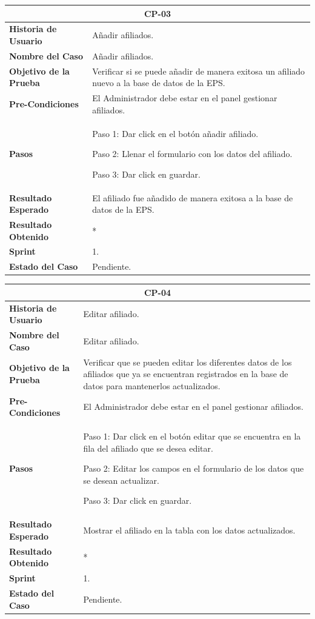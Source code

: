 \documentclass[12pt,a4paper]{article}
\begin{document}
\begin{center}
\begin{tabular}{|m{5cm}|m{9cm}|}
\hline
\multicolumn{2}{|c|}{\textbf{CP-03}} \\
\hline
\textbf{Historia de Usuario} & Añadir afiliados. \\
\hline
\textbf{Nombre del Caso} & Añadir afiliados. \\
\hline
\textbf{Objetivo de la Prueba} & Verificar si se puede añadir de manera exitosa un afiliado nuevo a la base de datos de la EPS. \\
\hline
\textbf{Pre-Condiciones} & El Administrador debe estar en el panel gestionar afiliados. \\
\hline
\textbf{Pasos} & Paso 1: Dar click en el botón añadir afiliado.

Paso 2: Llenar el formulario con los datos del afiliado.

Paso 3: Dar click en guardar.\\
\hline
\textbf{Resultado Esperado} & El afiliado fue añadido de manera exitosa a la base de datos de la EPS. \\
\hline
\textbf{Resultado Obtenido} & * \\
\hline
\textbf{Sprint} & 1. \\
\hline
\textbf{Estado del Caso} & Pendiente. \\
\hline
\end{tabular}
\vspace{5mm}

\begin{tabular}{|m{5cm}|m{9cm}|}
\hline
\multicolumn{2}{|c|}{\textbf{CP-04}} \\
\hline
\textbf{Historia de Usuario} & Editar afiliado. \\
\hline
\textbf{Nombre del Caso} & Editar afiliado. \\
\hline
\textbf{Objetivo de la Prueba} & Verificar que se pueden editar los diferentes datos de los afiliados que ya se encuentran registrados en la base de datos para mantenerlos actualizados. \\
\hline
\textbf{Pre-Condiciones} & El Administrador debe estar en el panel gestionar afiliados. \\
\hline
\textbf{Pasos} & Paso 1: Dar click en el botón editar que se encuentra en la fila del afiliado que se desea editar.

Paso 2: Editar los campos en el formulario de los datos que se desean actualizar.

Paso 3: Dar click en guardar.
 \\
\hline
\textbf{Resultado Esperado} & Mostrar el afiliado en la tabla con los datos actualizados. \\
\hline
\textbf{Resultado Obtenido} & * \\
\hline
\textbf{Sprint} & 1. \\
\hline
\textbf{Estado del Caso} & Pendiente. \\
\hline
\end{tabular}
\vspace{5mm}


\end{center}
\end{document}
